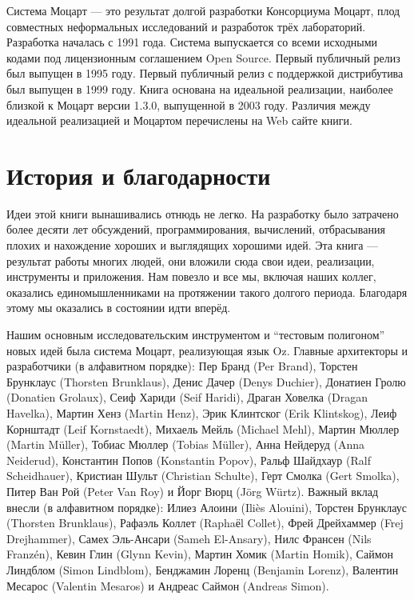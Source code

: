Система Моцарт --- это результат долгой разработки Консорциума Моцарт, плод совместных неформальных исследований и разработок трёх лабораторий. Разработка началась с 1991 года. Система выпускается со всеми исходными кодами под лицензионным соглашением Open Source. Первый публичный релиз был выпущен в 1995 году. Первый публичный релиз с поддержкой дистрибутива был выпущен в 1999 году. Книга основана на идеальной реализации, наиболее близкой к Моцарт версии 1.3.0, выпущенной в 2003 году. Различия между идеальной реализацией и Моцартом перечислены на Web сайте книги.

\section*{История и благодарности}

Идеи этой книги вынашивались отнюдь не легко. На разработку было затрачено более десяти лет обсуждений, программирования, вычислений, отбрасывания плохих и нахождение хороших и выглядящих хорошими идей. Эта книга --- результат работы многих людей, они вложили сюда свои идеи, реализации, инструменты и приложения. Нам повезло и все мы, включая наших коллег, оказались единомышленниками на протяжении такого долгого периода. Благодаря этому мы оказались в состоянии идти вперёд.

Нашим основным исследовательским инструментом и ``тестовым полигоном'' новых идей была система Моцарт, реализующая язык Oz. Главные архитекторы и разработчики (в алфавитном порядке): Пер Бранд (Per Brand), Торстен Брунклаус (Thorsten Brunklaus), Денис Дачер (Denys Duchier), Донатиен Гролю (Donatien Grolaux), Сеиф Хариди (Seif Haridi), Драган Ховелка (Dragan Havelka), Мартин Хенз (Martin Henz), Эрик Клинтског (Erik Klintskog), Леиф Корнштадт (Leif Kornstaedt), Михаель Мейль (Michael Mehl), Мартин Мюллер (Martin Müller), Тобиас Мюллер (Tobias Müller), Анна Нейдеруд (Anna Neiderud), Константин Попов (Konstantin Popov), Ральф Шайдхаур (Ralf Scheidhauer), Кристиан Шульт (Christian Schulte), Герт Смолка (Gert Smolka), Питер Ван Рой (Peter Van Roy) и Йорг Вюрц (Jörg Würtz). Важный вклад внесли (в алфавитном порядке): Илиез Алоини (Iliès Alouini), Торстен Брунклаус (Thorsten Brunklaus), Рафаэль Коллет (Raphaёl Collet), Фрей Дрейхаммер (Frej Drejhammer), Самех Эль-Ансари (Sameh El-Ansary), Нилс Франсен (Nils Franz{\'e}n), Кевин Глин ({Glynn Kevin}), Мартин Хомик (Martin Homik), Саймон Линдблом (Simon Lindblom), Бенджамин Лоренц ({Benjamin Lorenz}), Валентин Месарос (Valentin Mesaros) и Андреас Саймон (Andreas Simon).

